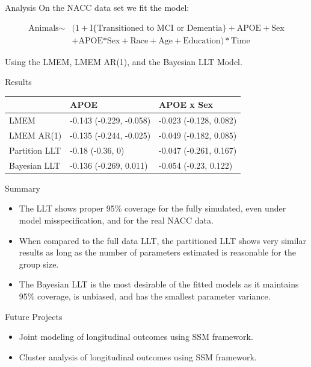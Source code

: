 \documentclass[
  ignorenonframetext,
]{beamer}
\providecommand{\tightlist}{%
  \setlength{\itemsep}{0pt}\setlength{\parskip}{0pt}}
\begin{document}
\begin{frame}{Analysis}
\protect\hypertarget{analysis}{}
On the NACC data set we fit the model:

\begin{equation*}
\begin{aligned}
\text{Animals} \sim & (1 + \text{I\{Transitioned to MCI or Dementia\}} + \text{APOE} + \text{Sex}\\
& + \text{APOE*Sex} + \text{Race} + \text{Age} + \text{Education}) * \text{Time}
\end{aligned}
\end{equation*}

Using the LMEM, LMEM AR(1), and the Bayesian LLT Model.
\end{frame}

\begin{frame}{Results}
\protect\hypertarget{results}{}
\begin{longtable}[t]{l|l|l}
\hline
  & APOE & APOE x Sex\\
\hline
LMEM & -0.143 (-0.229, -0.058) & -0.023 (-0.128, 0.082)\\
\hline
LMEM AR(1) & -0.135 (-0.244, -0.025) & -0.049 (-0.182, 0.085)\\
\hline
Partition LLT & -0.18 (-0.36, 0) & -0.047 (-0.261, 0.167)\\
\hline
Bayesian LLT & -0.136 (-0.269, 0.011) & -0.054 (-0.23, 0.122)\\
\hline
\end{longtable}
\end{frame}

\begin{frame}{Summary}
\protect\hypertarget{summary}{}
\begin{itemize}
\tightlist
\item
  The LLT shows proper 95\% coverage for the fully simulated, even under
  model misspecification, and for the real NACC data.
\item
  When compared to the full data LLT, the partitioned LLT shows very
  similar results as long as the number of parameters estimated is
  reasonable for the group size.
\item
  The Bayesian LLT is the most desirable of the fitted models as it
  maintains 95\% coverage, is unbiased, and has the smallest parameter
  variance.
\end{itemize}
\end{frame}

\begin{frame}{Future Projects}
\protect\hypertarget{future-projects}{}
\begin{itemize}
\tightlist
\item
  Joint modeling of longitudinal outcomes using SSM framework.
\item
  Cluster analysis of longitudinal outcomes using SSM framework.
\end{itemize}
\end{frame}
\end{document}

